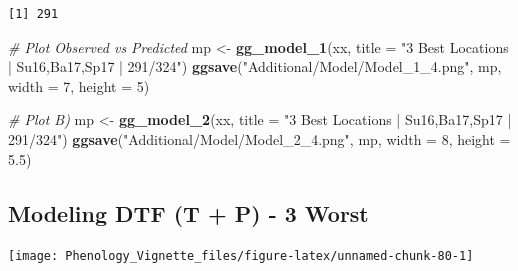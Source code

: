 \documentclass[
]{article}
\newenvironment{Shaded}{\begin{snugshade}}{\end{snugshade}}
\newcommand{\CommentTok}[1]{\textcolor[rgb]{0.56,0.35,0.01}{\textit{#1}}}
\newcommand{\DataTypeTok}[1]{\textcolor[rgb]{0.13,0.29,0.53}{#1}}
\newcommand{\DecValTok}[1]{\textcolor[rgb]{0.00,0.00,0.81}{#1}}
\newcommand{\FloatTok}[1]{\textcolor[rgb]{0.00,0.00,0.81}{#1}}
\newcommand{\KeywordTok}[1]{\textcolor[rgb]{0.13,0.29,0.53}{\textbf{#1}}}
\newcommand{\NormalTok}[1]{#1}
\newcommand{\OperatorTok}[1]{\textcolor[rgb]{0.81,0.36,0.00}{\textbf{#1}}}
\newcommand{\StringTok}[1]{\textcolor[rgb]{0.31,0.60,0.02}{#1}}
\begin{document}
\begin{Shaded}
\end{Shaded}

\begin{verbatim}
[1] 291
\end{verbatim}

\begin{Shaded}
\begin{Highlighting}[]
\CommentTok{# Plot Observed vs Predicted}
\NormalTok{mp <-}\StringTok{ }\KeywordTok{gg_model_1}\NormalTok{(xx, }\DataTypeTok{title =} \StringTok{"3 Best Locations | Su16,Ba17,Sp17 | 291/324"}\NormalTok{)}
\KeywordTok{ggsave}\NormalTok{(}\StringTok{"Additional/Model/Model_1_4.png"}\NormalTok{, mp, }\DataTypeTok{width =} \DecValTok{7}\NormalTok{, }\DataTypeTok{height =} \DecValTok{5}\NormalTok{)}
\end{Highlighting}
\end{Shaded}

\begin{Shaded}
\begin{Highlighting}[]
\CommentTok{# Plot B)}
\NormalTok{mp <-}\StringTok{ }\KeywordTok{gg_model_2}\NormalTok{(xx, }\DataTypeTok{title =} \StringTok{"3 Best Locations | Su16,Ba17,Sp17 | 291/324"}\NormalTok{)}
\KeywordTok{ggsave}\NormalTok{(}\StringTok{"Additional/Model/Model_2_4.png"}\NormalTok{, mp, }\DataTypeTok{width =} \DecValTok{8}\NormalTok{, }\DataTypeTok{height =} \FloatTok{5.5}\NormalTok{)}
\end{Highlighting}
\end{Shaded}

\hypertarget{modeling-dtf-t-p---3-worst}{%
\subsection{Modeling DTF (T + P) - 3
Worst}\label{modeling-dtf-t-p---3-worst}}

\texttt{[image: Phenology\_Vignette\_files/figure-latex/unnamed-chunk-80-1]}
\end{document}
